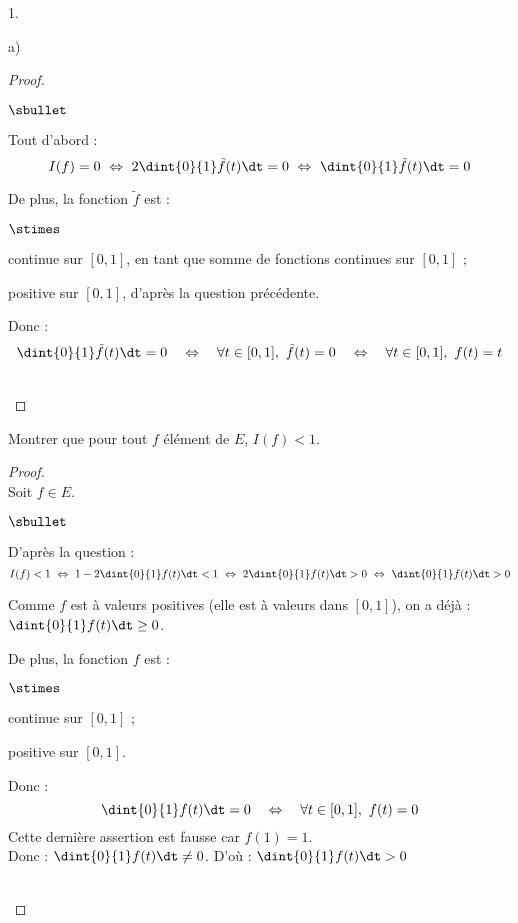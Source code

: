 \documentclass[11pt]{article}%
\begin{document}
\begin{noliste}{1.}
\begin{noliste}{a)}
  \begin{proof}~
  \begin{noliste}{$\sbullet$}
    \item Tout d'abord :
    \[
      I(f) = 0 \ \Leftrightarrow \ 2 \dint{0}{1} \tilde{f}(t) \dt =0
      \ \Leftrightarrow \ \dint{0}{1} \tilde{f}(t) \dt=0
    \]

    \item De plus, la fonction $\tilde{f}$ est :
    \begin{noliste}{$\stimes$}
      \item continue sur $[0,1]$, en tant que somme de fonctions
      continues sur $[0,1]$ ;
      \item positive sur $[0,1]$, d'après la question précédente.
    \end{noliste}
    Donc :
    \[
      \dint{0}{1} \tilde{f}(t) \dt = 0 \quad \Leftrightarrow \quad 
      \forall t \in [0,1], \ \tilde{f}(t)=0 \quad 
      \Leftrightarrow \quad \forall t \in [0,1], \ f(t)=t
    \]
  \end{noliste}
  ~\\[-1cm]
  \end{proof}
  
  
  
  

  
  \item Montrer que pour tout $f$ élément de $E$, $I(f) < 1$.
  
  \begin{proof}~\\
    Soit $f\in E$.
    \begin{noliste}{$\sbullet$}
      \item D'après la question  :
      \[
        I(f) <1 \ \Leftrightarrow \ 1-2\dint{0}{1} f(t) \dt <1 \
        \Leftrightarrow \ 2 \dint{0}{1} f(t) \dt >0 \ 
        \Leftrightarrow \ \dint{0}{1} f(t) \dt >0
      \]
      
      \item Comme $f$ est à valeurs positives (elle est à valeurs dans 
      $[0,1]$), on a déjà : $\dint{0}{1} f(t) \dt \geq 0$.
      
      \item De plus, la fonction $f$ est :
      \begin{noliste}{$\stimes$}
	\item continue sur $[0,1]$ ;
	\item positive sur $[0,1]$.
      \end{noliste}
      Donc :
      \[
        \dint{0}{1} f(t) \dt = 0 \quad \Leftrightarrow \quad 
        \forall t \in [0,1], \ f(t)=0
      \]
      Cette dernière assertion est fausse car $f(1)=1$.\\
      Donc : $\dint{0}{1} f(t) \dt \neq 0$. D'où : 
      $\dint{0}{1} f(t) \dt >0$
    \end{noliste}
    ~\\[-1cm]
  \end{proof}


\end{noliste}
\end{noliste}
\end{document}
